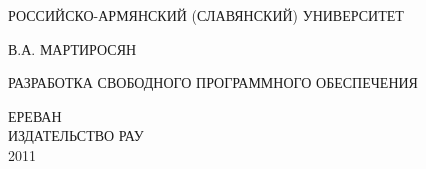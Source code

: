 
\newpage
\thispagestyle{empty}
{\large
\begin{center}
РОССИЙСКО-АРМЯНСКИЙ (СЛАВЯНСКИЙ) УНИВЕРСИТЕТ
\end{center}


\vskip 180pt

\begin{center}

В.А. МАРТИРОСЯН

\vskip 50pt

РАЗРАБОТКА СВОБОДНОГО ПРОГРАММНОГО ОБЕСПЕЧЕНИЯ
\end{center}

\vskip 260pt
\begin{center}
ЕРЕВАН \\
ИЗДАТЕЛЬСТВО РАУ\\
2011
\end{center}
}
